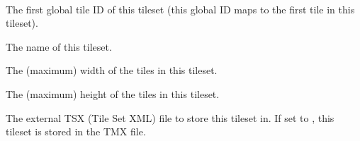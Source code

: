 \documentclass[letterpaper,10pt,english]{sphinxmanual}
\begin{document}
\begin{fulllineitems}
\label{index:tmx.Tileset}~

\begin{fulllineitems}
\label{index:tmx.Tileset.firstgid}
The first global tile ID of this tileset (this global ID maps to
the first tile in this tileset).

\end{fulllineitems}


\begin{fulllineitems}
\label{index:tmx.Tileset.name}
The name of this tileset.

\end{fulllineitems}


\begin{fulllineitems}
\label{index:tmx.Tileset.tilewidth}
The (maximum) width of the tiles in this tileset.

\end{fulllineitems}


\begin{fulllineitems}
\label{index:tmx.Tileset.tileheight}
The (maximum) height of the tiles in this tileset.

\end{fulllineitems}


\begin{fulllineitems}
\label{index:tmx.Tileset.source}
The external TSX (Tile Set XML) file to store this tileset in.
If set to , this tileset is stored in the TMX file.

\end{fulllineitems}


\end{fulllineitems}
\end{document}
